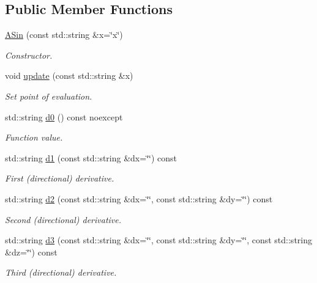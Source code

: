 \subsection*{Public Member Functions}
\begin{DoxyCompactItemize}
\item 
\hyperlink{structFunG_1_1texify_1_1ASin_a8221eb34628298fb26ca8de5f885f974}{A\-Sin} (const std\-::string \&x=\char`\"{}x\char`\"{})
\begin{DoxyCompactList}\small\item\em Constructor. \end{DoxyCompactList}\item 
void \hyperlink{structFunG_1_1texify_1_1ASin_a7ab289642f3643132c4566c9166f8e08}{update} (const std\-::string \&x)
\begin{DoxyCompactList}\small\item\em Set point of evaluation. \end{DoxyCompactList}\item 
std\-::string \hyperlink{structFunG_1_1texify_1_1ASin_a5f87a42235c262e2e739d218d2830de7}{d0} () const noexcept
\begin{DoxyCompactList}\small\item\em Function value. \end{DoxyCompactList}\item 
std\-::string \hyperlink{structFunG_1_1texify_1_1ASin_a29ea3b1a1a439c28d7b8f62b06c8ba37}{d1} (const std\-::string \&dx=\char`\"{}\char`\"{}) const 
\begin{DoxyCompactList}\small\item\em First (directional) derivative. \end{DoxyCompactList}\item 
std\-::string \hyperlink{structFunG_1_1texify_1_1ASin_af4a439065864319c0f6d757fbd91163f}{d2} (const std\-::string \&dx=\char`\"{}\char`\"{}, const std\-::string \&dy=\char`\"{}\char`\"{}) const 
\begin{DoxyCompactList}\small\item\em Second (directional) derivative. \end{DoxyCompactList}\item 
std\-::string \hyperlink{structFunG_1_1texify_1_1ASin_a713815d60bc379b274a6cdceaa5fa9f9}{d3} (const std\-::string \&dx=\char`\"{}\char`\"{}, const std\-::string \&dy=\char`\"{}\char`\"{}, const std\-::string \&dz=\char`\"{}\char`\"{}) const 
\begin{DoxyCompactList}\small\item\em Third (directional) derivative. \end{DoxyCompactList}\end{DoxyCompactItemize}


